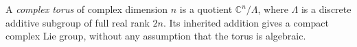 
A \emph{complex torus} of complex dimension $n$ is a quotient $\mathbb C^n/\Lambda$, where $\Lambda$ is a discrete additive subgroup of full real rank $2n$. Its inherited addition gives a compact complex Lie group, without any assumption that the torus is algebraic.

